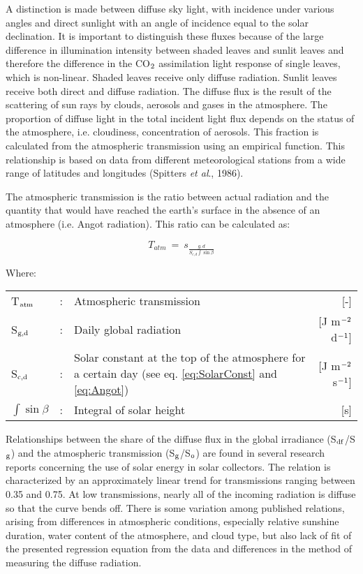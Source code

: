 A distinction is made between diffuse sky light, with incidence under various angles and
direct sunlight with an angle of incidence equal to the solar declination. It is important 
to distin\-guish these fluxes because of the large difference in illumination intensity 
between shaded leaves and sunlit leaves and therefore the difference in the CO$_{{\rm 2}}$ 
assimila\-tion light response of single leaves, which is non-linear. Shaded leaves receive 
only diffuse radiation. Sunlit leaves receive both direct and diffuse radiation. The 
diffuse flux is the result of the scattering of sun rays by clouds, aerosols and gases in 
the atmo\-sphere. The propor\-tion of diffuse light in the total incident light flux depends 
on the status of the atmosphere, i.e. cloudi\-ness, concentra\-tion of aerosols. This 
fraction is calculated from the atmospheric transmis\-sion using an empirical function. 
This relationship is based on data from different meteorologi\-cal stations from a wide 
range of latitudes and longitudes (Spitters {\it et al}., 1986). 

The atmospheric transmission is the ratio between actual radiation and the quantity that
would have reached the earth's surface in the absence of an atmosphere (i.e. Angot
radiation). This ratio can be calculated as:

\begin{equation}
\label{eq:Tatm}
T _{atm} ~=~ s _{\frac{g,d}{S _{c,d} \int \sin \beta }}
\end{equation}

Where:\\[5pt]
\begin{tabularx}{\textwidth}{llXr}
T$_{{\rm atm}}$ &:& Atmospheric transmission  & [-]\\
S$_{{\rm g,d}}$ &:& Daily global radiation  & [J m$^{{\rm -2}}$ d$^{{\rm -1}}$]\\
S$_{{\rm c,d}}$ &:& Solar constant at the top of the atmosphere for a certain day 
    (see eq. \ref{eq:SolarConst} and \ref{eq:Angot})  & [J m$^{{\rm -2}}$ s$^{{\rm -1}}$]\\
$\int \sin \beta$  &:& Integral of solar height   & [s]\\
\end{tabularx}

Relationships between the share of the diffuse flux in the global irradiance 
(S$_{{\rm df}}$/S$_{{\rm g}}$) and the atmospheric transmission 
(S$_{{\rm g}}$/S$_{{\rm o}}$) are found in several research reports concerning the use
of solar energy in solar collectors. The relation is characterized by an approximately
linear trend for transmissions ranging between 0.35 and 0.75. At low transmissions,
nearly all of the incoming radiation is diffuse so that the curve bends off.
There is some variation among published relations, arising from differences in atmospheric 
conditions, especially relative sunshine duration, water content of the atmosphere,
and cloud type, but also lack of fit of the presented regression equation from the data and
differences in the method of measuring the diffuse radiation.

